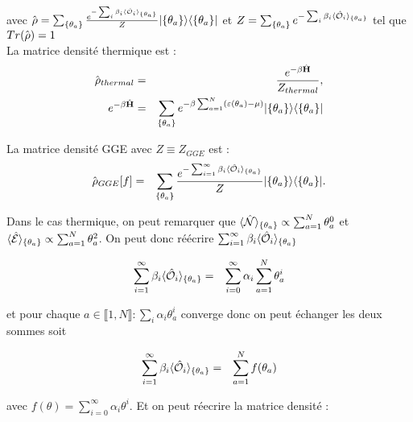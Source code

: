 	avec $\hat{\mathbf{\rho}} = \sum_{\{\theta_a \}}\frac{e^{-\sum_i \beta_i \langle \hat{\mathbf{\mathcal{O}}}_i \rangle_{\{\theta_a \}} }}{Z} \vert \{\theta_a \}  \rangle   	\langle \{\theta_a \} \vert $ et $Z = \sum_{\{\theta_a \}}e^{-\sum_i \beta_i \langle \hat{\mathbf{\mathcal{O}}}_i \rangle_{ \{\theta_a \} } } $ tel que $Tr (  \hat{\mathbf{\rho}}) = 1 $\\
	
	La matrice densité thermique est :
	\begin{eqnarray}
		\hat{\mathbf{\rho}}_{thermal} & = & \frac{e^{- \beta \hat{\mathbf{H}}}}{Z_{thermal}}, \\
		e^{-\beta \hat{\mathbf{H}}} & = & 	\sum_{\{\theta_a \}} e^{- \beta \sum_{a=1}^N ( \varepsilon(\theta_a)- \mu ) } \vert \{ \theta_a\} \rangle \langle  \{ \theta_a\}  \vert 
	\end{eqnarray}


La matrice densité GGE avec $Z \equiv Z_{GGE}$ est :
	\begin{eqnarray}
		\hat{\mathbf{\rho}}_{GGE}[f] & = & \sum_{\{\theta_a \}}\frac{e^{-\sum_{i = 1}^\infty  \beta_i \langle \hat{\mathbf{\mathcal{O}}}_i \rangle_{\{\theta_a \}} }}{Z} \vert \{\theta_a \}  \rangle   	\langle \{\theta_a \} \vert. 
	\end{eqnarray}
	
	Dans le cas thermique, on peut remarquer que $\langle \hat{\mathbf{\mathcal{N}}} \rangle_{\{ \theta_a\} } \propto \sum_{a = 1}^N \theta_a^0 $ et $\langle \hat{\mathbf{\mathcal{E}}} \rangle_{\{ \theta_a\} } \propto \sum_{a = 1}^N \theta_a^2 $. On peut donc réécrire $\sum_{i = 1}^\infty  \beta_i \langle \hat{\mathbf{\mathcal{O}}}_i \rangle_{ \{\theta_a \} }$
	
	\begin{eqnarray}
		\sum_{i = 1}^\infty  \beta_i \langle \hat{\mathbf{\mathcal{O}}}_i \rangle_{ \{\theta_a \} } & = & \sum_{i = 0}^\infty \alpha_i \sum_{a = 1 }^N \theta_a^i		
	\end{eqnarray}
	
	et pour chaque $a \in \llbracket 1 , N  \rrbracket \colon \sum_i \alpha_i \theta_a^i$ converge donc on peut échanger les deux sommes soit 
	
	\begin{eqnarray}
		\sum_{i = 1}^\infty  \beta_i \langle \hat{\mathbf{\mathcal{O}}}_i \rangle_{ \{\theta_a \} } & = & \sum_{a = 1 }^N  f(\theta_a) 
	\end{eqnarray}
	
	avec $f(\theta) =  \sum_{i = 0}^\infty \alpha_i  \theta^i$.	 Et on peut réecrire la matrice densité  :
	
